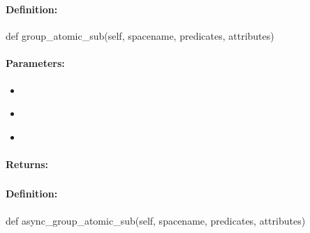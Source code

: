 \pagebreak
\subsubsection{}
\label{api:python:group_atomic_sub}


\paragraph{Definition:}
\begin{pythoncode}
def group_atomic_sub(self, spacename, predicates, attributes)
\end{pythoncode}

\paragraph{Parameters:}
\begin{itemize}[noitemsep]
\item {}\\

\item {}\\

\item {}\\

\end{itemize}

\paragraph{Returns:}


\pagebreak
\subsubsection{}
\label{api:python:async_group_atomic_sub}


\paragraph{Definition:}
\begin{pythoncode}
def async_group_atomic_sub(self, spacename, predicates, attributes)
\end{pythoncode}

